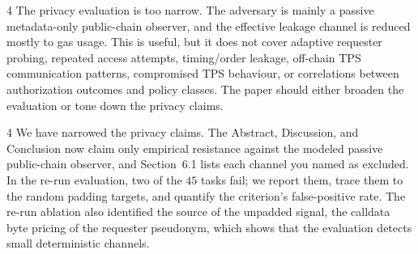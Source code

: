 \begin{reviewcomment}{4}
	The privacy evaluation is too narrow.
	The adversary is mainly a passive metadata-only public-chain observer, and the effective leakage channel is reduced mostly to gas usage.
	This is useful, but it does not cover adaptive requester probing, repeated access attempts, timing/order leakage, off-chain TPS communication patterns, compromised TPS behaviour, or correlations between authorization outcomes and policy classes.
	The paper should either broaden the evaluation or tone down the privacy claims.
\end{reviewcomment}

\begin{reviewresponse}{4}
	We have narrowed the privacy claims.
	The Abstract, Discussion, and Conclusion now claim only empirical resistance against the modeled passive public-chain observer, and Section~6.1 lists each channel you named as excluded.
	In the re-run evaluation, two of the $45$ tasks fail; we report them, trace them to the random padding targets, and quantify the criterion's false-positive rate.
	The re-run ablation also identified the source of the unpadded signal, the calldata byte pricing of the requester pseudonym, which shows that the evaluation detects small deterministic channels.

\end{reviewresponse}
